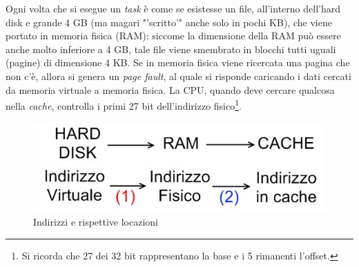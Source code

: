 Ogni volta che si esegue un \textit{task} è come se esistesse un file, all'interno dell'hard disk e grande 4 GB (ma magari "'scritto'" anche solo in pochi KB), che viene portato in memoria fisica (RAM): siccome la dimensione della RAM può essere anche molto inferiore a 4 GB, tale file viene smembrato in blocchi tutti uguali (pagine) di dimensione 4 KB. Se in memoria fisica viene ricercata una pagina che non c'è, allora si genera un \textit{page fault}, al quale si risponde caricando i dati cercati da memoria virtuale a memoria fisica.
La CPU, quando deve cercare qualcosa nella \textit{cache}, controlla i primi 27 bit dell'indirizzo fisico\footnote{Si ricorda che 27 dei 32 bit rappresentano la base e i 5 rimanenti l'offset.}.

\begin{figure}[!h]
\centering
\includegraphics[width=0.6\columnwidth]{img/hdrc}
\caption{Indirizzi e rispettive locazioni}
\label{fig:hdrc}
\end{figure}

